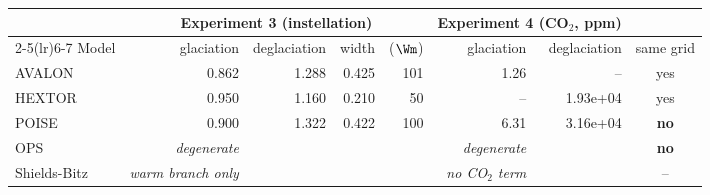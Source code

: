 \small
\begin{tabular}{lrrrrrrc}
\toprule
 & \multicolumn{4}{c}{Experiment 3 (instellation)} & \multicolumn{2}{c}{Experiment 4 (CO$_2$, ppm)} & \\
\cmidrule(lr){2-5}\cmidrule(lr){6-7}
Model & glaciation & deglaciation & width & ($\Wm$) & glaciation & deglaciation & same grid \\
\midrule
AVALON & 0.862 & 1.288 & 0.425 & 101 & 1.26 & -- & yes \\
HEXTOR & 0.950 & 1.160 & 0.210 & 50 & -- & 1.93e+04 & yes \\
POISE & 0.900 & 1.322 & 0.422 & 100 & 6.31 & 3.16e+04 & \textbf{no} \\
OPS & \textit{degenerate} &  &  &  & \textit{degenerate} &  & \textbf{no} \\
Shields-Bitz & \textit{warm branch only} &  &  &  & \textit{no CO$_2$ term} &  & -- \\
\bottomrule
\end{tabular}
